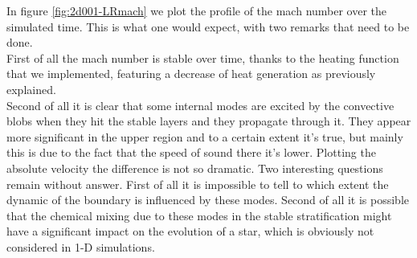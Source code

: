 In figure \ref{fig:2d001-LRmach} we plot the profile of the mach number over the simulated time. This is what one would expect, with two remarks that need to be done. \\
First of all the mach number is stable over time, thanks to the heating function that we implemented, featuring a decrease of heat generation as previously explained. \\
Second of all it is clear that some internal modes are excited by the convective blobs when they hit the stable layers and they propagate through it. They appear more significant in the upper region and to a certain extent it's true, but mainly this is due to the fact that the speed of sound there it's lower. Plotting the absolute velocity the difference is not so dramatic. Two interesting questions remain without answer. First of all it is impossible to tell to which extent the dynamic of the boundary is influenced by these modes. Second of all it is possible that the chemical mixing due to these modes in the stable stratification might have a significant impact on the evolution of a star, which is obviously not considered in 1-D simulations.\\
\begin{figure}[t!]
  \centering
  \centering
  \hfill
  \end{figure}
